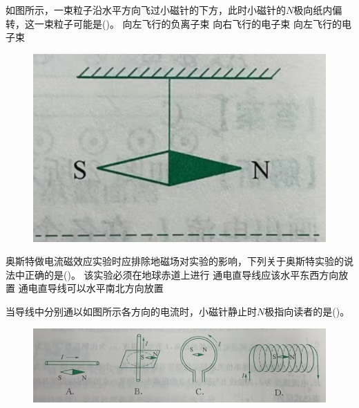 \documentclass[a4paper,cs4size]{BHCexam}
\begin{document}
\begin{groups}
\begin{questions}[]
        \question[5] 如图所示，一束粒子沿水平方向飞过小磁针的下方，此时小磁针的$N$极向纸内偏转，这一束粒子可能是(\quad\quad\quad)。
        {向左飞行的负离子束}
        {向右飞行的电子束}
        {向左飞行的电子束}
        \begin{figure}[htb]
            \flushright
            \includegraphics [scale=0.4,trim=0 0 0 0]{./image/physics_circuit5_4.png}
            \label{fig:fig_circuit5_4}
        \end{figure}
        \vspace{2.5cm}

        \question[5] 奥斯特做电流磁效应实验时应排除地磁场对实验的影响，下列关于奥斯特实验的说法中正确的是(\quad\quad\quad)。
        {该实验必须在地球赤道上进行}
        {通电直导线应该水平东西方向放置}
        {通电直导线可以水平南北方向放置}
        \vspace{2.5cm}

        \question[5] 当导线中分别通以如图所示各方向的电流时，小磁针静止时$N$极指向读者的是(\quad\quad\quad)。
        \begin{figure}[htb]
            \center
            \includegraphics [scale=0.7,trim=0 0 0 0]{./image/physics_circuit5_5.png}
            \label{fig:fig_circuit5_5}
        \end{figure}
        \vspace{2.5cm}


\end{questions}
\end{groups}
\end{document}
